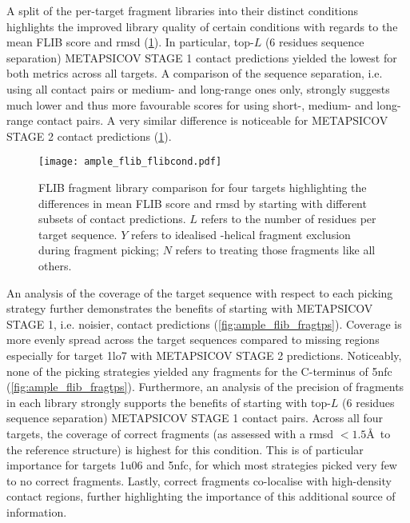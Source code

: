 A split of the per-target fragment libraries into their distinct conditions highlights the improved library quality of certain conditions with regards to the mean FLIB score and \gls{rmsd} (\cref{fig:ample_flib_flibcond}). In particular, top-$L$ (6 residues sequence separation) METAPSICOV STAGE 1 contact predictions yielded the lowest for both metrics across all targets. A comparison of the sequence separation, i.e. using all contact pairs or medium- and long-range ones only, strongly suggests much lower and thus more favourable scores for using short-, medium- and long-range contact pairs. A very similar difference is noticeable for METAPSICOV STAGE 2 contact predictions (\cref{fig:ample_flib_flibcond}). 

\begin{figure}[H]
	\centering
	\texttt{[image: ample\_flib\_flibcond.pdf]}
	\caption[FLIB fragment library comparison]{FLIB fragment library comparison for four targets highlighting the differences in mean FLIB score and \gls{rmsd} by starting with different subsets of contact predictions. $L$ refers to the number of residues per target sequence. $Y$ refers to idealised \textalpha-helical fragment exclusion during fragment picking; $N$ refers to treating those fragments like all others.}
	\label{fig:ample_flib_flibcond}
\end{figure}

An analysis of the coverage of the target sequence with respect to each picking strategy further demonstrates the benefits of starting with METAPSICOV STAGE 1, i.e. noisier, contact predictions (\cref{fig:ample_flib_fragtps}). Coverage is more evenly spread across the target sequences compared to missing regions especially for target 1lo7 with METAPSICOV STAGE 2 predictions. Noticeably, none of the picking strategies yielded any fragments for the C-terminus of 5nfc (\cref{fig:ample_flib_fragtps}). Furthermore, an analysis of the precision of fragments in each library strongly supports the benefits of starting with top-$L$ (6 residues sequence separation) METAPSICOV STAGE 1 contact pairs. Across all four targets, the coverage of correct fragments (as assessed with a \gls{rmsd} $<1.5$\AA\ to the reference structure) is highest for this condition. This is of particular importance for targets 1u06 and 5nfc, for which most strategies picked very few to no correct fragments. Lastly, correct fragments co-localise with high-density contact regions, further highlighting the importance of this additional source of information. 


